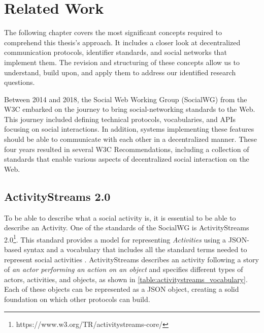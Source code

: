 \chapter{Related Work}
\label{cha:relatedwork}

The following chapter covers the most significant concepts required to comprehend this thesis's approach. It includes a closer look at decentralized communication protocols, identifier standards, and social networks that implement them. The revision and structuring of these concepts allow us to understand, build upon, and apply them to address our identified research questions. 

Between 2014 and 2018, the Social Web Working Group (SocialWG) from the W3C embarked on the journey to bring social-networking standards to the Web. This journey included defining technical protocols, vocabularies, and APIs focusing on social interactions. In addition, systems implementing these features should be able to communicate with each other in a decentralized manner. These four years resulted in several W3C Recommendations, including a collection of standards that enable various aspects of decentralized social interaction on the Web\cite{celik_prodromou_le_hors_2014}. 

\section{ActivityStreams 2.0}\label{section:activity_streams}

To be able to describe what a social activity is, it is essential to be able to describe an Activity. One of the standards of the SocialWG is ActivityStreams 2.0\footnote{https://www.w3.org/TR/activitystreams-core/}. This standard provides a model for representing \emph{Activities} using a JSON-based syntax and a vocabulary that includes all the standard terms needed to represent social activities \cite{snell_prodromou_2017}. ActivityStreams describes an activity following a story of \emph{an actor performing an action on an object} and specifies different types of actors, activities, and objects, as shown in \autoref{table:activitystreams_vocabulary}. Each of these objects can be represented as a JSON object, creating a solid foundation on which other protocols can build. 


